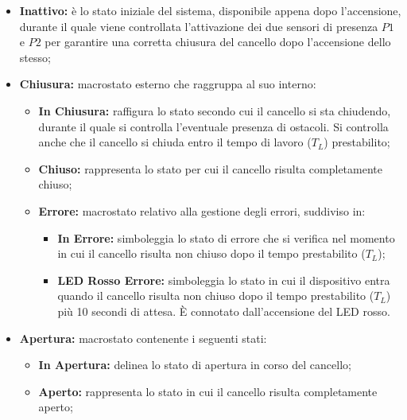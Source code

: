 \begin{itemize}
    \item \textbf{Inattivo:} è lo stato iniziale del sistema, disponibile appena dopo l'accensione, durante il quale viene controllata l'attivazione dei due sensori di presenza $P1$ e $P2$ per garantire una corretta chiusura del cancello dopo l'accensione dello stesso;

    \item \textbf{Chiusura:} macrostato esterno che raggruppa al suo interno:
        \begin{itemize}
            \item \textbf{In Chiusura:} raffigura lo stato secondo cui il cancello si sta chiudendo, durante il quale si controlla l'eventuale presenza di ostacoli. Si controlla anche che il cancello si chiuda entro il tempo di lavoro ($T_L$) prestabilito;
        
            \item \textbf{Chiuso:} rappresenta lo stato per cui il cancello risulta completamente chiuso;

            \item \textbf{Errore:} macrostato relativo alla gestione degli errori, suddiviso in:

            \begin{itemize}
                \item \textbf{In Errore:} simboleggia lo stato di errore che si verifica nel momento in cui il cancello risulta non chiuso dopo il tempo prestabilito ($T_L$);

                \item \textbf{LED Rosso Errore:} simboleggia lo stato in cui il dispositivo entra quando il cancello risulta non chiuso dopo il tempo prestabilito ($T_L$) più 10 secondi di attesa. È connotato dall'accensione del LED rosso.
            \end{itemize}
        \end{itemize}
    
    \item \textbf{Apertura:} macrostato contenente i seguenti stati:
        \begin{itemize}
            \item \textbf{In Apertura:} delinea lo stato di apertura in corso del cancello;
    
            \item \textbf{Aperto:} rappresenta lo stato in cui il cancello risulta completamente aperto;
        \end{itemize}


\end{itemize}
